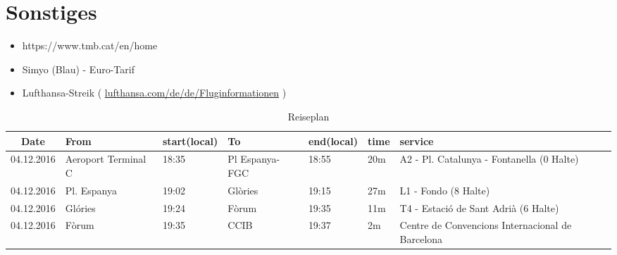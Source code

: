 \documentclass[a4paper]{scrartcl}
\begin{document}
\section*{Sonstiges}
\begin{itemize}
    \item https://www.tmb.cat/en/home
    \item Simyo (Blau) - Euro-Tarif
    \item Lufthansa-Streik ( \href{http://www.lufthansa.com/de/de/Fluginformationen}{lufthansa.com/de/de/Fluginformationen} )
\end{itemize}

    \begin{table}[ht]
        \centering
        \begin{tabular}{cp{3cm} p{1cm} p{3cm} p{1cm} l p{5cm}}
        \toprule
    \textbf{Date}  & \textbf{From}        & \textbf{start\newline (local)} & \textbf{To} & \textbf{end\newline (local)}  & \textbf{time} & \textbf{service} \\ \midrule
    04.12.2016 & Aeroport Terminal C      & 18:35          & Pl Espanya-FGC           & 18:55    &    20m & A2 - Pl. Catalunya - Fontanella (0 Halte) \\
    04.12.2016 & Pl. Espanya              & 19:02          & Glòries                  & 19:15    &    27m & L1 - Fondo (8 Halte) \\
    04.12.2016 & Glóries                  & 19:24          & Fòrum                    & 19:35    &    11m & T4 - Estació de Sant Adrià (6 Halte)\\
    04.12.2016 & Fòrum                    & 19:35          & CCIB                     & 19:37    &     2m & Centre de Convencions Internacional de Barcelona \\\midrule
        \bottomrule
        \end{tabular}
        \caption{Reiseplan}
        \label{table:reiseplan}
    \end{table}
\end{document}

